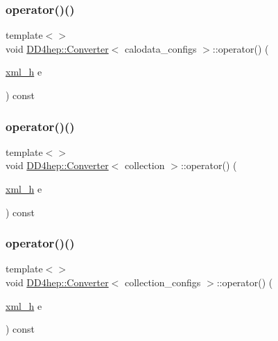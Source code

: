 \hypertarget{struct_d_d4hep_1_1_converter_a3d5d2b2b1b9ecc31ef5800c484a5715a}{}\label{struct_d_d4hep_1_1_converter_a3d5d2b2b1b9ecc31ef5800c484a5715a} 
\subsubsection{\texorpdfstring{operator()()}{operator()()}\hspace{0.1cm}{\footnotesize\ttfamily [8/22]}}
{\footnotesize\ttfamily template$<$$>$ \\
void \hyperlink{struct_d_d4hep_1_1_converter}{D\+D4hep\+::\+Converter}$<$ calodata\+\_\+configs $>$\+::operator() (\begin{DoxyParamCaption}\item[{\hyperlink{_det_factory_helper_8h_ac13b3c79d2bc9214ff0cf5b8dc43dda6}{xml\+\_\+h}}]{e }\end{DoxyParamCaption}) const}

\hypertarget{struct_d_d4hep_1_1_converter_a3e5bad3d53f7bece1327c60b038e1cdb}{}\label{struct_d_d4hep_1_1_converter_a3e5bad3d53f7bece1327c60b038e1cdb} 
\subsubsection{\texorpdfstring{operator()()}{operator()()}\hspace{0.1cm}{\footnotesize\ttfamily [9/22]}}
{\footnotesize\ttfamily template$<$$>$ \\
void \hyperlink{struct_d_d4hep_1_1_converter}{D\+D4hep\+::\+Converter}$<$ collection $>$\+::operator() (\begin{DoxyParamCaption}\item[{\hyperlink{_det_factory_helper_8h_ac13b3c79d2bc9214ff0cf5b8dc43dda6}{xml\+\_\+h}}]{e }\end{DoxyParamCaption}) const}

\hypertarget{struct_d_d4hep_1_1_converter_a4b35a0d98dd264dae10197867aa1602b}{}\label{struct_d_d4hep_1_1_converter_a4b35a0d98dd264dae10197867aa1602b} 
\subsubsection{\texorpdfstring{operator()()}{operator()()}\hspace{0.1cm}{\footnotesize\ttfamily [10/22]}}
{\footnotesize\ttfamily template$<$$>$ \\
void \hyperlink{struct_d_d4hep_1_1_converter}{D\+D4hep\+::\+Converter}$<$ collection\+\_\+configs $>$\+::operator() (\begin{DoxyParamCaption}\item[{\hyperlink{_det_factory_helper_8h_ac13b3c79d2bc9214ff0cf5b8dc43dda6}{xml\+\_\+h}}]{e }\end{DoxyParamCaption}) const}

